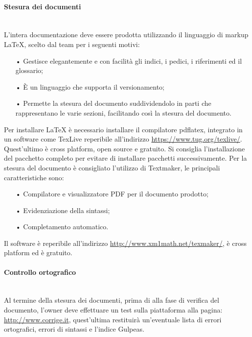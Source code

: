 \paragraph{Stesura dei documenti}\mbox{}\\
L'intera documentazione deve essere prodotta utilizzando il {linguaggio di markup} \LaTeX{}, scelto dal team per i seguenti motivi:
\begin{itemize}
\item[•] Gestisce elegantemente e con facilità gli indici, i pedici, i riferimenti ed il glossario;
\item[•] È un linguaggio che supporta il {versionamento};
\item[•] Permette la stesura del documento suddividendolo in parti che rappresentano le varie sezioni, facilitando così la stesura del documento.
\end{itemize}
Per installare \LaTeX{} è necessario installare il compilatore pdflatex, integrato in un software come TexLive reperibile all'indirizzo \url{https://www.tug.org/texlive/}. Quest'ultimo è {cross platform}, {open source} e gratuito. Si consiglia l'installazione del pacchetto completo per evitare di installare pacchetti successivamente.
Per la stesura del documento è consigliato l'utilizzo di Textmaker, le principali caratteristiche sono:
\begin{itemize}
	\item[•] Compilatore e visualizzatore {PDF} per il documento prodotto;
	\item[•] Evidenziazione della sintassi;
	\item[•] Completamento automatico.
\end{itemize}  
Il software è reperibile all'indirizzo \url{http://www.xm1math.net/texmaker/}, è cross platform ed è gratuito.

\paragraph{Controllo ortografico}\mbox{}\\
Al termine della stesura dei documenti, prima di alla fase di verifica del documento, l’owner deve effettuare un test sulla piattaforma alla pagina: \url{ http://www.corrige.it}, quest’ultima restituirà un’eventuale lista di errori ortografici, errori di sintassi e l’indice Gulpeas.

